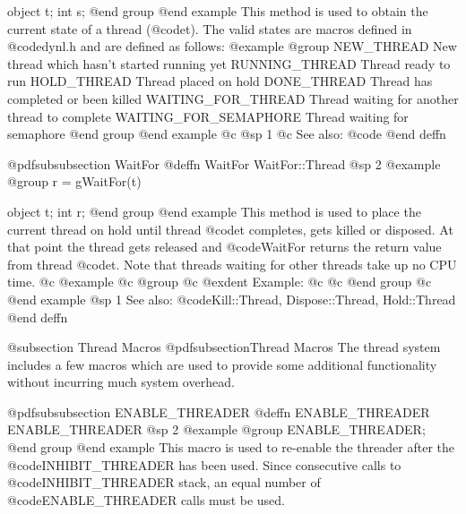 object  t;
int     s;
@end group
@end example
This method is used to obtain the current state of a thread (@code{t}).
The valid states are macros defined in @code{dynl.h} and are defined as
follows:
@example
@group
NEW_THREAD             New thread which hasn't started running
                       yet
RUNNING_THREAD         Thread ready to run
HOLD_THREAD            Thread placed on hold
DONE_THREAD            Thread has completed or been killed
WAITING_FOR_THREAD     Thread waiting for another thread to
                       complete
WAITING_FOR_SEMAPHORE  Thread waiting for semaphore
@end group
@end example
@c @sp 1
@c See also:  @code{}
@end deffn
















@pdfsubsubsection {WaitFor}
@deffn {WaitFor} WaitFor::Thread
@sp 2
@example
@group
r = gWaitFor(t)

object  t;
int     r;
@end group
@end example
This method is used to place the current thread on hold until thread
@code{t} completes, gets killed or disposed.  At that point the thread
gets released and @code{WaitFor} returns the return value from thread
@code{t}.  Note that threads waiting for other threads take up no CPU time.
@c @example
@c @group
@c @exdent Example:
@c 
@c @end group
@c @end example
@sp 1
See also:  @code{Kill::Thread, Dispose::Thread, Hold::Thread}
@end deffn







@subsection Thread Macros
@pdfsubsection{Thread Macros}
The thread system includes a few macros which are used to provide
some additional functionality without incurring much system overhead.

















@pdfsubsubsection {ENABLE_THREADER}
@deffn {ENABLE_THREADER} ENABLE_THREADER
@sp 2
@example
@group
ENABLE_THREADER;
@end group
@end example
This macro is used to re-enable the threader after the
@code{INHIBIT_THREADER} has been used.  Since consecutive calls to
@code{INHIBIT_THREADER} stack, an equal number of @code{ENABLE_THREADER}
calls must be used.

